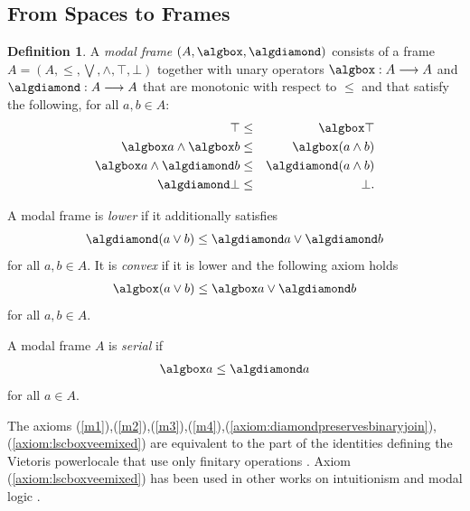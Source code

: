 \documentclass{article}[a4paper]
\theoremstyle{definition}
\newtheorem{definition}{Definition}%
\begin{document}
\subsection{From Spaces to Frames}

\begin{definition}
A \emph{modal frame} 
$(A , \algbox , \algdiamond )$ 
consists of a frame 
$A = (A, \leq , \bigvee , \wedge , \top , \bot)$ together with unary operators $\algbox:A \longrightarrow A$ and $\algdiamond: A  \longrightarrow A$ that are monotonic with respect to $\leq$ and that satisfy the following, for all $a,b \in A$:
\begin{eqnarray}
\label{m1} 
    \top  & \leq & \algbox \top      \\
\label{m2} 
    \algbox a \wedge \algbox b  & \leq & \algbox (a \wedge b)  \\
\label{m3}
    \algbox a \wedge \algdiamond b & \leq & 
    \algdiamond (a \wedge b)  \\
\label{m4}
    \algdiamond \bot & \leq    & \bot                  .
\end{eqnarray}

A modal frame is \emph{lower} if it additionally satisfies 
\begin{equation}
\label{axiom:diamondpreservesbinaryjoin}
\algdiamond (a \vee b) \leq 
\algdiamond a \vee \algdiamond b  
\end{equation}
for all $a, b \in A$.
%
It is \emph{convex} if it is lower and the following axiom holds
\begin{align}
     \label{axiom:lscboxveemixed}
    \algbox (a \vee b) \leq \algbox a \vee \algdiamond b
\end{align}
for all $a,b \in A$.

A modal frame $A$ is \emph{serial} if 
\begin{align}
    \label{ax:serial}
    \algbox a \leq \algdiamond a 
\end{align}
for all $a \in A$.
\end{definition}

The axioms (\ref{m1}),(\ref{m2}),(\ref{m3}),(\ref{m4}),(\ref{axiom:diamondpreservesbinaryjoin}),(\ref{axiom:lscboxveemixed}) are equivalent to the part of the identities defining the Vietoris powerlocale that use only finitary operations \cite{joh82b}. 
Axiom (\ref{axiom:lscboxveemixed}) has been used in other works on intuitionism and modal logic \cite{ewald86,plostir}.
\end{document}
